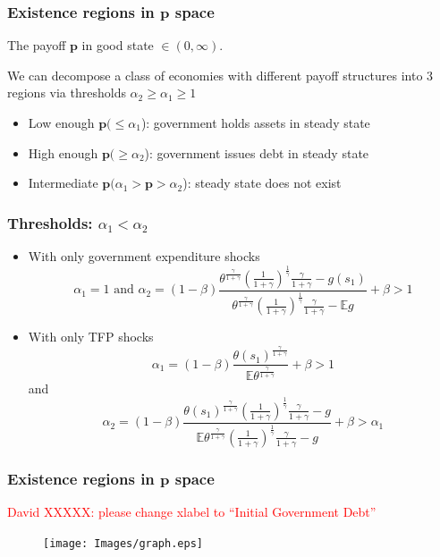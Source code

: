 \documentclass{beamer}
\newcommand{\EE}{\mathbb E}
\begin{document}
\begin{frame}
\frametitle{Existence regions in $\bm{p}$ space}

The payoff $\bm{p}$ in good state
$\in (0,\infty)$.

We can decompose a class of economies with different payoff structures into 3 regions via thresholds $\alpha_2\geq\alpha_1\geq1$



  \begin{itemize}
   \item Low enough $\bm{p}(\leq \alpha_1$): government holds assets in steady state
   \item High enough $\bm{p} (\geq \alpha_2$): government  issues debt  in steady state
   \item Intermediate $\bm{p} (\alpha_1>\bm{p}>\alpha_2$): steady state does not exist
  \end{itemize}

 \end{frame}




\begin{frame}
 \frametitle{Thresholds: $\alpha_1 <\alpha_2$}
	\begin{itemize}
		\item With only government expenditure shocks
		\[
			\alpha_1 = 1 \text{  and }  \alpha_2 = (1-\beta)\frac{\theta^\frac{\gamma}{1+\gamma}\left(\frac{1}{1+\gamma}\right)^\frac1\gamma\frac{\gamma}{1+\gamma}-g(s_1)}{\theta^\frac{\gamma}{1+\gamma}\left(\frac{1}{1+\gamma}\right)^\frac1\gamma\frac{\gamma}{1+\gamma}-\EE g} +\beta>1
		\]
		\item With only TFP shocks
		\[
			\alpha_1 = (1-\beta)\frac{\theta(s_1)^\frac{\gamma}{1+\gamma}}{\EE\theta^\frac{\gamma}{1+\gamma}}+\beta > 1
		\]and
		\[
		\alpha_2 = (1-\beta)\frac{\theta(s_1)^\frac{\gamma}{1+\gamma}\left(\frac{1}{1+\gamma}\right)^\frac1\gamma\frac{\gamma}{1+\gamma}-g}{\EE\theta^\frac{\gamma}{1+\gamma}\left(\frac{1}{1+\gamma}\right)^\frac1\gamma\frac{\gamma}{1+\gamma}-g}+\beta>\alpha_1
		\]
	\end{itemize}
 \end{frame}


\begin{frame}
   \frametitle{Existence regions in $\bm{p}$ space}
   \textcolor{red}{David XXXXX: please change xlabel to ``Initial Government Debt''}
	\begin{figure}
		\begin{center}
		\texttt{[image: Images/graph.eps]}
	\end{center}	
	\end{figure}

  \end{frame}
\end{document}
